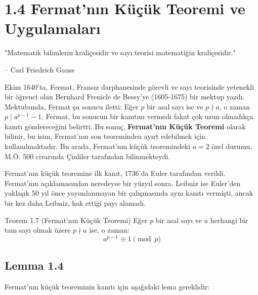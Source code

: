 \documentclass[12pt]{article}
\begin{document}
\section*{1.4 Fermat'nın Küçük Teoremi ve Uygulamaları}

\begin{tcolorbox}[colback=gray!5, colframe=black]
\justifying
"Matematik bilimlerin kraliçesidir ve sayı teorisi matematiğin kraliçesidir."

\vspace{0.3cm}
\raggedleft
-- Carl Friedrich Gauss
\end{tcolorbox}

 Ekim 1640'ta, Fermat, Fransız darphanesinde görevli ve sayı teorisinde yetenekli bir öğrenci olan Bernhard Frenicle de Bessy'ye (1605-1675) bir mektup yazdı. Mektubunda, Fermat şu sonucu iletti: Eğer $p$ bir asal sayı ise ve $p \nmid a$, o zaman $p \mid a^{p-1} - 1$. Fermat, bu sonucun bir kanıtını vermedi fakat çok uzun olmadıkça kanıtı göndereceğini belirtti. Bu sonuç, \textbf{Fermat'nın Küçük Teoremi} olarak bilinir, bu isim, Fermat'nın son teoreminden ayırt edebilmek için kullanılmaktadır. Bu arada, Fermat'nın küçük teoremindeki $a = 2$ özel durumu, M.Ö. 500 civarında Çinliler tarafından bilinmekteydi.

Fermat'nın küçük teoremine ilk kanıt, 1736'da Euler tarafından verildi. Fermat'nın açıklamasından neredeyse bir yüzyıl sonra. Leibniz ise Euler'den yaklaşık 50 yıl önce yayımlanmayan bir çalışmasında aynı kanıtı vermişti, ancak bir kez daha Leibniz, hak ettiği payı alamadı.

\begin{theorembox}{Teorem 1.7 (Fermat'nın Küçük Teoremi)}
Eğer $p$ bir asal sayı ve $a$ herhangi bir tam sayı olmak üzere $p \nmid a$ ise, o zaman:
\[
a^{p-1} \equiv 1 \pmod{p}
\]
\end{theorembox}

\subsection*{Lemma 1.4}
Fermat'nın küçük teoreminin kanıtı için aşağıdaki lema gereklidir:
\end{document}
